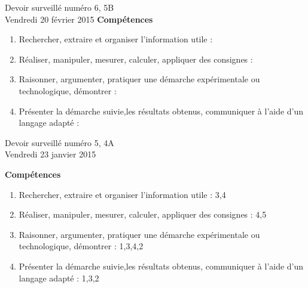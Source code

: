 \documentclass[a4paper,10pt]{article}
\begin{document}
\begin{feuilleDS}{Devoir surveillé numéro 6, 5B\\ \small Vendredi 20 février 2015}
\vspace{1cm}
{\bf Compétences}
\begin{enumerate}
    \item
        Rechercher, extraire et organiser l'information utile : 
    \item
        Réaliser, manipuler, mesurer, calculer, appliquer des consignes : 
    \item
        Raisonner, argumenter, pratiquer une démarche expérimentale ou technologique, démontrer :
    \item 
        Présenter la démarche suivie,les résultats obtenus, communiquer à l'aide d’un langage adapté : 
\end{enumerate}
\end{feuilleDS}


\begin{feuilleDS}{Devoir surveillé numéro 5, 4A\\ \small Vendredi 23 janvier 2015}

\vspace{1cm}
{\bf Compétences}
\begin{enumerate}
    \item
        Rechercher, extraire et organiser l'information utile : 3,4
    \item
        Réaliser, manipuler, mesurer, calculer, appliquer des consignes : 4,5
    \item
        Raisonner, argumenter, pratiquer une démarche expérimentale ou technologique, démontrer : 1,3,4,2
    \item 
        Présenter la démarche suivie,les résultats obtenus, communiquer à l'aide d’un langage adapté : 1,3,2
\end{enumerate}
\end{feuilleDS}
\end{document}
